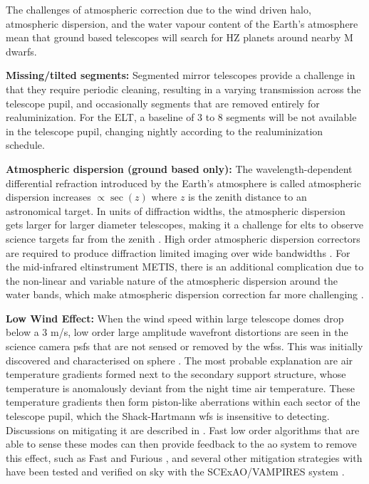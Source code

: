 \documentclass[letterpaper]{ar-1col}
\begin{document}
%
The challenges of atmospheric correction due to the wind driven halo, atmospheric dispersion, and the water vapour content of the Earth's atmosphere mean that ground based telescopes will search for HZ planets around nearby M dwarfs.

{\bf Missing/tilted segments:} Segmented mirror telescopes provide a challenge in that they require periodic cleaning, resulting in a varying transmission across the telescope pupil, and occasionally segments that are removed entirely for realuminization.
%
For the ELT, a baseline of 3 to 8 segments will be not available in the telescope pupil, changing nightly according to the realuminization schedule.

{\bf Atmospheric dispersion (ground based only):} The wavelength-dependent differential refraction introduced by the Earth's atmosphere is called atmospheric dispersion increases $\propto \sec(z)$ where $z$ is the zenith distance to an astronomical target.
%
In units of diffraction widths, the atmospheric dispersion gets larger for larger diameter telescopes, making it a challenge for \acp{elt} to observe science targets far from the zenith \citep{Kendrew08,Skemer09}.
%
High order atmospheric dispersion correctors are required to produce diffraction limited imaging over wide bandwidths \citep{Kopon13}.
%
For the mid-infrared \ac{elt}instrument METIS, there is an additional complication due to the non-linear and variable nature of the atmospheric dispersion around the water bands, which make atmospheric dispersion correction far more challenging \citep{Absil22}.

{\bf Low Wind Effect: } When the wind speed within large telescope domes drop below a 3 m/s, low order large amplitude wavefront distortions are seen in the science camera \acp{psf} that are not sensed or removed by the \acp{wfs}.
%
This was initially discovered and characterised on \ac{sphere} \citep{Sauvage16}.
%
The most probable explanation are air temperature gradients formed next to the secondary support structure, whose temperature is anomalously deviant from the night time air temperature.
%
These temperature gradients then form piston-like aberrations within each sector of the telescope pupil, which the Shack-Hartmann \ac{wfs} is insensitive to detecting.
%
Discussions on mitigating it are described in \citet{Milli18}.
%
Fast low order algorithms that are able to sense these modes can then provide feedback to the \ac{ao} system to remove this effect, such as Fast and Furious \citep{Wilby18}, and several other mitigation strategies with have been tested and verified on sky with the SCExAO/VAMPIRES system \citep{Vievard19}.
\end{document}
